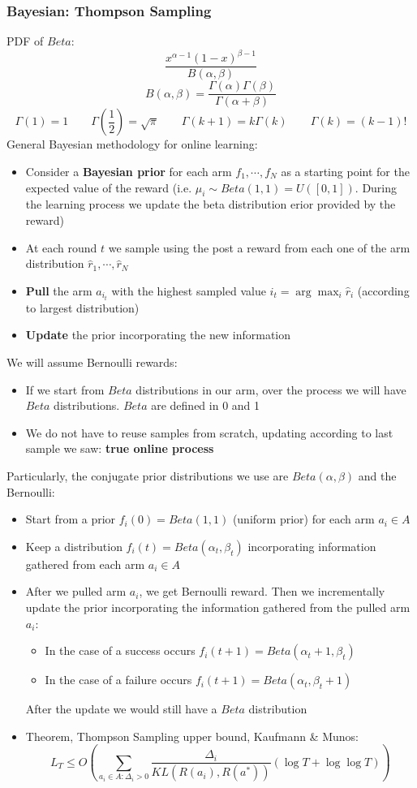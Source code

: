 \subsubsection{Bayesian: Thompson Sampling}
    PDF of $Beta$:
    $$\frac{x^{\alpha-1}(1-x)^{\beta-1}
    }{
        B(\alpha,\beta)
    }$$
    $$B(\alpha,\beta)=\frac{\Gamma(\alpha)\Gamma(\beta)
    }{
        \Gamma(\alpha+\beta)
    }$$
    $$
    \Gamma(1)=1\qquad \Gamma(\frac{1}{2})=\sqrt\pi\qquad
    \Gamma(k+1)=k\Gamma(k)\qquad\Gamma(k)=(k-1)!
    $$
    General Bayesian methodology for online learning:
    \begin{itemize}
        \item Consider a \textbf{Bayesian prior} for each arm $f_1,\cdots,f_N$ as a starting point for the expected value of the reward (i.e. $\mu_i\sim Beta(1,1)=U([0,1])$. During the learning process we update the beta distribution erior provided by the reward)
        \item At each round $t$ we sample using the post a reward from each one of the arm distribution $\hat{r}_1,\cdots,\hat{r}_N$
        \item \textbf{Pull} the arm $a_{i_t}$ with the highest sampled value $i_t=\arg\max_i\hat{r}_i$ (according to largest distribution)
        \item \textbf{Update} the prior incorporating the new information
    \end{itemize}
    We will assume Bernoulli rewards:
    \begin{itemize}
        \item If we start from $Beta$ distributions in our arm, over the process we will have $Beta$ distributions. $Beta$ are defined in 0 and 1
        \item We do not have to reuse samples from scratch, updating according to last sample we saw: \textbf{true online process}
    \end{itemize}
    Particularly, the conjugate prior distributions we use are $Beta(\alpha, \beta)$ and the Bernoulli:
    \begin{itemize}
        \item Start from a prior $f_i(0)=Beta(1,1)$ (uniform prior) for each arm $a_i\in A$
        \item Keep a distribution $f_i(t)=Beta(\alpha_t,\beta_t)$ incorporating information gathered from each arm $a_i\in A$
        \item After we pulled arm $a_i$, we get Bernoulli reward. Then we incrementally update the prior incorporating the information gathered from the pulled arm $a_i$:
        \begin{itemize}
            \item In the case of a success occurs $f_i(t+1)=Beta(\alpha_t+1,\beta_t)$
            \item In the case of a failure occurs $f_i(t+1)=Beta(\alpha_t,\beta_t+1)$
        \end{itemize}
        After the update we would still have a $Beta$ distribution
        \item Theorem, Thompson Sampling upper bound, Kaufmann \& Munos:
        $$L_T\leq O\left(\sum_{a_i\in A:\Delta_i>0}\frac{\Delta_i}{KL(R(a_i),R(a^*))}(\log T+\log\log T)\right)$$
    \end{itemize}
